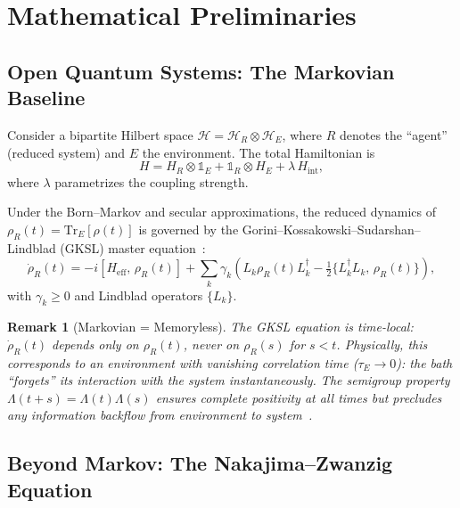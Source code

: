 \documentclass[12pt,a4paper,openany]{book}
\newtheorem{remark}[theorem]{Remark}
\begin{document}
\section{Mathematical Preliminaries}
\label{I-sec:prelim}

\subsection{Open Quantum Systems: The Markovian Baseline}

Consider a bipartite Hilbert space
$\mathcal{H} = \mathcal{H}_R \otimes \mathcal{H}_E$,
where $R$ denotes the ``agent'' (reduced system) and $E$ the
environment. The total Hamiltonian is
\begin{equation}
\label{I-eq:H_total}
H = H_R \otimes \mathbb{1}_E
  + \mathbb{1}_R \otimes H_E
  + \lambda\, H_{\mathrm{int}},
\end{equation}
where $\lambda$ parametrizes the coupling strength.

Under the Born--Markov and secular approximations, the reduced
dynamics of $\rho_R(t) = \mathrm{Tr}_E[\rho(t)]$ is governed by
the Gorini--Kossakowski--Sudarshan--Lindblad (GKSL) master
equation~\cite{Lindblad1976,GKS1976}:
\begin{equation}
\label{I-eq:GKSL}
\dot{\rho}_R(t)
= -i[H_{\mathrm{eff}},\, \rho_R(t)]
  + \sum_k \gamma_k \left(
    L_k \rho_R(t) L_k^\dagger
    - \tfrac{1}{2}\{L_k^\dagger L_k,\, \rho_R(t)\}
  \right),
\end{equation}
with $\gamma_k \geq 0$ and Lindblad operators $\{L_k\}$.

\begin{remark}[Markovian = Memoryless]
\label{I-rem:markov}
The GKSL equation is \emph{time-local}: $\dot{\rho}_R(t)$ depends
only on $\rho_R(t)$, never on $\rho_R(s)$ for $s < t$.
Physically, this corresponds to an environment with vanishing
correlation time ($\tau_E \to 0$): the bath ``forgets'' its
interaction with the system instantaneously.
The semigroup property $\Lambda(t+s) = \Lambda(t)\Lambda(s)$
ensures complete positivity at all times but precludes any
information backflow from environment to system~\cite{RivasHuelgaPlenio2014}.
\end{remark}

\subsection{Beyond Markov: The Nakajima--Zwanzig Equation}
\end{document}
